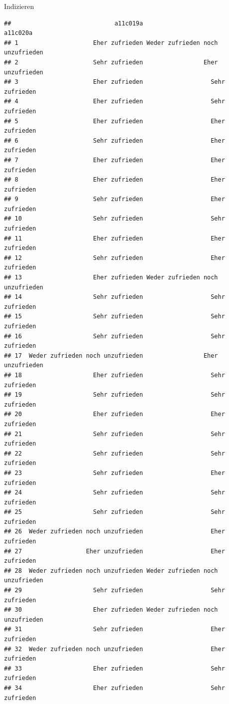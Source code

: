 \documentclass[ignorenonframetext,]{beamer}
\begin{document}
\begin{frame}[fragile]{Indizieren}
\begin{verbatim}
##                             a11c019a                         a11c020a
## 1                     Eher zufrieden Weder zufrieden noch unzufrieden
## 2                     Sehr zufrieden                 Eher unzufrieden
## 3                     Eher zufrieden                   Sehr zufrieden
## 4                     Eher zufrieden                   Sehr zufrieden
## 5                     Eher zufrieden                   Eher zufrieden
## 6                     Sehr zufrieden                   Eher zufrieden
## 7                     Eher zufrieden                   Eher zufrieden
## 8                     Eher zufrieden                   Eher zufrieden
## 9                     Sehr zufrieden                   Eher zufrieden
## 10                    Sehr zufrieden                   Sehr zufrieden
## 11                    Eher zufrieden                   Eher zufrieden
## 12                    Sehr zufrieden                   Eher zufrieden
## 13                    Eher zufrieden Weder zufrieden noch unzufrieden
## 14                    Sehr zufrieden                   Sehr zufrieden
## 15                    Sehr zufrieden                   Sehr zufrieden
## 16                    Sehr zufrieden                   Sehr zufrieden
## 17  Weder zufrieden noch unzufrieden                 Eher unzufrieden
## 18                    Eher zufrieden                   Sehr zufrieden
## 19                    Sehr zufrieden                   Sehr zufrieden
## 20                    Eher zufrieden                   Eher zufrieden
## 21                    Sehr zufrieden                   Sehr zufrieden
## 22                    Sehr zufrieden                   Sehr zufrieden
## 23                    Sehr zufrieden                   Eher zufrieden
## 24                    Sehr zufrieden                   Sehr zufrieden
## 25                    Sehr zufrieden                   Sehr zufrieden
## 26  Weder zufrieden noch unzufrieden                   Eher zufrieden
## 27                  Eher unzufrieden                   Eher zufrieden
## 28  Weder zufrieden noch unzufrieden Weder zufrieden noch unzufrieden
## 29                    Sehr zufrieden                   Sehr zufrieden
## 30                    Eher zufrieden Weder zufrieden noch unzufrieden
## 31                    Sehr zufrieden                   Eher zufrieden
## 32  Weder zufrieden noch unzufrieden                   Eher zufrieden
## 33                    Eher zufrieden                   Sehr zufrieden
## 34                    Eher zufrieden                   Sehr zufrieden

\end{verbatim}
\end{frame}
\end{document}

